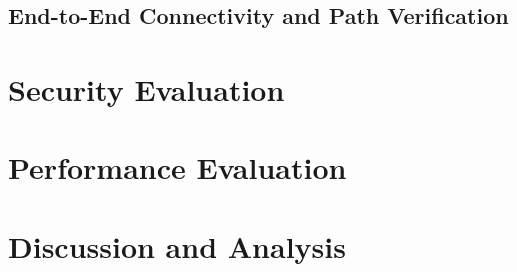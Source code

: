 \subsection{End-to-End Connectivity and Path Verification}



\section{Security Evaluation}



\section{Performance Evaluation}



\section{Discussion and Analysis}




